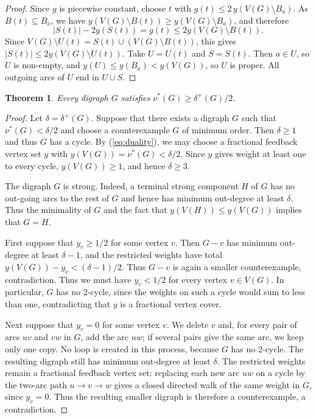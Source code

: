 \documentclass[10pt,a4paper]{article}
\newtheorem{theorem}{Theorem}[section]
\numberwithin{equation}{section}
\begin{document}
\begin{proof}
Since $g$ is piecewise constant, choose $t$ with
$g(t)\le 2\,y(V(G)\setminus B_a)$. As $B(t)\subseteq B_a$, we have
$y(V(G)\setminus B(t))\ge y(V(G)\setminus B_a)$, and therefore
$$
|S(t)|-2y(S(t))=g(t)\le 2y(V(G)\setminus B(t)).
$$
Since $V(G)\setminus U(t)=S(t)\cup(V(G)\setminus B(t))$, this gives $
|S(t)|\le 2y(V(G)\setminus U(t))$. Take $U=U(t)$ and $S=S(t)$. Then $a\in U$, so $U$ is non-empty, and
$y(U)\le y(B_a)<y(V(G))$, so $U$ is proper. All outgoing arcs of $U$
end in $U\cup S$.
\end{proof}


\begin{theorem}\label{thm:fractional}
Every digraph $G$ satisfies $\nu^\ast(G)\ge\delta^+(G)/2$.
\end{theorem}


\begin{proof}
Let $\delta=\delta^+(G)$. Suppose that there exists a digraph $G$ such that $\nu^\ast(G)<\delta/2$ and choose a counterexample $G$ of minimum order. Then $\delta\ge 1$ and thus $G$ has a cycle. 
 By (\ref{eq:duality}), we may choose a
fractional feedback vertex set $y$ with 
$y(V(G))=\nu^\ast(G)<\delta/2$. Since $y$ gives weight at least one to every cycle, $y(V(G))\ge1$, and
hence $\delta\ge3$.

The digraph $G$ is strong. Indeed, a terminal strong component $H$ of $G$ has no out-going 
arcs to the rest of $G$ and hence has  minimum out-degree at least $\delta$. Thus the minimality of $G$ and the fact that $y(V(H))\leq y(V(G))$ implies that $G=H$.

First suppose that $y_v\ge1/2$ for some vertex $v$.
Then $G-v$ has minimum out-degree at least $\delta-1$, and the
restricted weights have total $y(V(G))-y_v<(\delta-1)/2$. Thus $G-v$ is again a smaller counterexample, contradiction. Thus we must have $y_v<1/2$ for every
vertex $v\in V(G)$. In particular, $G$ has no 2-cycle,
since the weights on such a cycle would sum to less than one, contradicting that $y$ is a fractional vertex cover.

Next suppose that $y_v=0$ for some vertex $v$. We delete $v$ and, for
every pair of arcs $uv$ and $vw$ in $G$, add the arc $uw$; if several
pairs give the same arc, we keep only one copy. No loop is created in
this process, because $G$ has no 2-cycle. The resulting digraph still has minimum out-degree at least $\delta$. The
restricted weights remain a fractional feedback vertex set: replacing each
new arc $uw$ on a cycle by the two-arc path $u\to v\to w$ gives a closed
directed walk of the same weight in $G$, since $y_v=0$.
Thus the resulting smaller digraph is therefore a counterexample, a
contradiction.


\end{proof}
\end{document}
